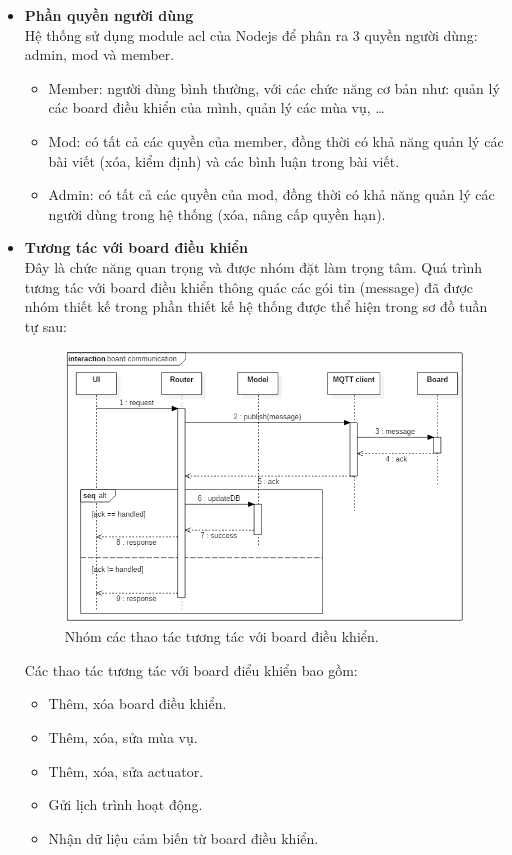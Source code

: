 \documentclass[a4paper,12pt,oneside]{article}
\begin{document}
\begin{itemize}
	\item \textbf{Phần quyền người dùng}\\
	Hệ thống sử dụng module acl của Nodejs để phân ra 3 quyền người dùng: admin, mod và member.

	\begin{itemize}
		\item Member: người dùng bình thường, với các chức năng cơ bản như: quản lý các board điều khiển của mình, quản lý các mùa vụ, …
		\item Mod: có tất cả các quyền của member, đồng thời có khả năng quản lý các bài viết (xóa, kiểm định) và các bình luận trong bài viết.
		\item Admin: có tất cả các quyền của mod, đồng thời có khả năng quản lý các người dùng trong hệ thống (xóa, nâng cấp quyền hạn).
	\end{itemize}
	
	\item \textbf{Tương tác với board điều khiển}\\
	Đây là chức năng quan trọng và được nhóm đặt làm trọng tâm. Quá trình tương tác với board điều khiển thông quác các gói tin (message) đã được nhóm thiết kế trong phần thiết kế hệ thống được thể hiện trong sơ đồ tuần tự sau:
	
	\begin{figure}[H]
		\centering
		\includegraphics[scale=.6]{hinh/seq-board-communication.png}
		\caption{Nhóm các thao tác tương tác với board điều khiển.}
	\end{figure}
	Các thao tác tương tác với board điểu khiển bao gồm:
	\begin{itemize}
 	\item Thêm, xóa board điều khiển.
	\item Thêm, xóa, sửa mùa vụ.
	\item Thêm, xóa, sửa actuator.
	\item Gửi lịch trình hoạt động.
	\item Nhận dữ liệu cảm biến từ board điều khiển.
	\end{itemize}


\end{itemize}
\end{document}
